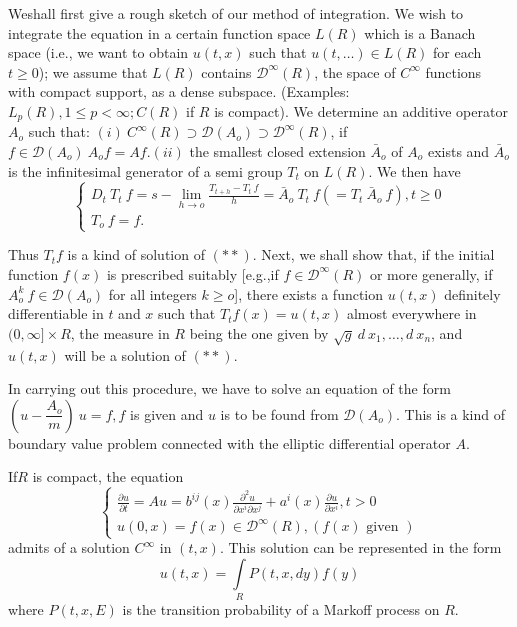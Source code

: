 We\pageoriginale shall first give a rough sketch of our method of integration. We
wish to integrate the equation in a certain function space $L(R)$
which is a Banach space (i.e., we want to obtain $u(t,x)$ such that
$u(t,\ldots) \in L(R)$ for each $t \ge 0$); we assume that $L(R)$
contains $\mathscr{D}^\infty(R)$, the space of $C^\infty$ functions
with compact support, as a dense subspace. (Examples: $L_p(R), 1 \le p
< \infty; C(R)$ if $R$ is compact). We determine an additive operator
$A_o$ such that: $(i) ~ C^\infty (R) \supset \mathscr{D}(A_o) \supset
\mathscr{D}^\infty (R)$, if $f \in \mathscr{D}(A_o) ~ A_o f = Af.(ii)$
the smallest closed extension $\bar{A}_o$ of $A_o$ exists and
$\bar{A}_o$ is the infinitesimal generator of a semi group $T_t$ on
$L(R)$. We then have 
\begin{equation*}
 \begin{cases}
  D_t ~ T_t ~ f = s - \lim\limits_{h\rightarrow o} \frac{T_{t+h} -
   T_t ~ f}{h} = \bar{A}_o ~T_t ~ f (= T_t ~ \bar{A}_o ~ f), t \ge
  0\\ 
  T_o ~ f = f.
 \end{cases}
\end{equation*}

Thus $T_t f$ is a kind of solution of $(**)$. Next, we shall show
that, if the initial function $f(x)$ is prescribed suitably [e.g.,if
 $f \in \mathscr{D}^\infty (R)$ or more generally, if $A_o^k ~ f \in
 \mathscr{D}(A_o)$ for all integers $k \ge o$], there exists a
function $u(t, x) $ definitely differentiable in $t$ and $x$ such that $T_tf(x) =
u(t,x)$ almost everywhere in $(0,\infty] \times R$, the measure in $R$
being the one given by $\sqrt{g} ~ d ~ x_1,\ldots,d ~ x_n$, and
$u(t,x)$ will be a solution of $(**)$. 

In carrying out this procedure, we have to solve an equation of the
form $\left(u -\dfrac{A_o}{m}\right) ~ u = f, f$ is given and $u$ is
to be found 
from $\mathscr{D}(A_o)$. This is a kind of boundary value problem
connected with the elliptic differential operator $A$. 

\begin{theorem*}
 If\pageoriginale $R$ is compact, the equation
 \begin{equation*}
  \begin{cases}
   \frac{\partial u}{\partial t} = Au = b^{ij}(x) \frac{\partial^2
    u}{\partial x^i \partial x^j} + a^i (x) \frac{\partial
    u}{\partial x^i}, t>0\\ 
   u(0, x) = f(x) \in \mathscr{
    D}^\infty (R), (f(x) \text{ given })
  \end{cases}
 \end{equation*}
 admits of a solution $C^\infty$ in $(t,x)$. This solution can be
 represented in the form 
 $$
 u(t, x) = \int \limits_R P (t, x, dy) f(y)
 $$
 where $P(t, x, E)$ is the transition probability of a Markoff
 process on $R$. 
\end{theorem*}

